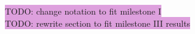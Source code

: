 \documentclass{aa}
\numberwithin{equation}{section}
\numberwithin{table}{section}
\numberwithin{figure}{section}
\begin{document}
\colorbox{Plum}{TODO: change notation to fit milestone I} \\
\colorbox{Plum}{TODO: rewrite section to fit milestone III results}



\end{document}
